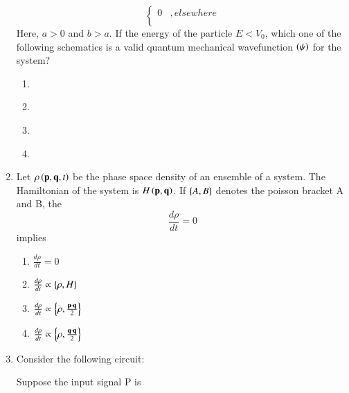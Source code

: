 \documentclass[journal,12pt,onecolumn]{IEEEtran}
\theoremstyle{remark}
\begin{document}
\begin{enumerate}
\[\begin{cases}
0 & ,elsewhere\\
\end{cases}
\]
Here, $a>0$ and $b>a$. If the energy of the particle $E<V_0$, which one of the following schematics is a valid quantum mechanical wavefunction $\left(\psi\right)$ for the system?
\begin{enumerate}
    \item \begin{figure}[!ht]
\centering
\resizebox{0.3\textwidth}{!}{%

}%
\end{figure}
    \item \begin{figure}[!ht]
\centering
\resizebox{0.3\textwidth}{!}{%

}%
\end{figure}
    \item \begin{figure}[!ht]
\centering
\resizebox{0.3\textwidth}{!}{%

}%
\end{figure}
    \item \begin{figure}[!ht]
\centering
\resizebox{0.3\textwidth}{!}{%

}%
\end{figure}
\end{enumerate}
\item Let $\rho\left(\mathbf{p},\mathbf{q},t\right)$ be the phase space density of an ensemble of a system. The Hamiltonian of the system is $H\left(\mathbf{p},\mathbf{q}\right)$. If $\left\{A,B\right\}$ denotes the poisson bracket A and B, the 
$$\frac{d\rho}{dt}=0$$ implies
\begin{enumerate}
    \item $\frac{d\rho}{dt}=0$
    \item $\frac{d\rho}{dt} \propto \left\{\rho,H\right\}$
    \item $\frac{d\rho}{dt} \propto \left\{\rho,\frac{\mathbf{p}\cdot\mathbf{q}}{2}\right\}$
    \item $\frac{d\rho}{dt} \propto \left\{\rho,\frac{\mathbf{q}\cdot\mathbf{q}}{2}\right\}$
\end{enumerate}
\item Consider the following circuit:\\
\begin{figure}[!ht]
\centering
\resizebox{0.2\textwidth}{!}{%

}%
\end{figure}
Suppose the input signal P is\\
\begin{figure}[!ht]
\centering
\resizebox{0.2\textwidth}{!}{%
}
\end{figure}
\end{enumerate}
\end{document}
